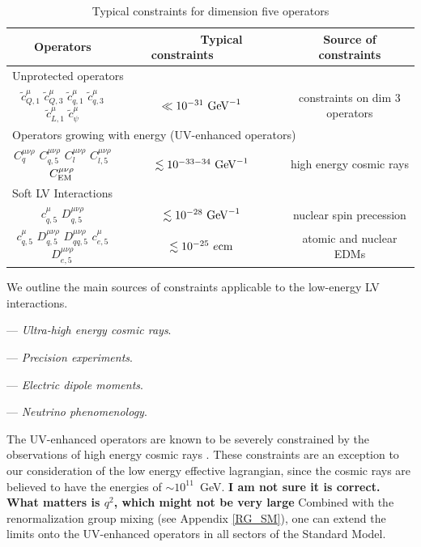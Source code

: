 \documentclass[12pt,preprintnumbers,nofootinbib]{revtex4}
\newcommand{\wt}{\widetilde}
\newcommand{\el}{{\rm EM}}
\begin{document}
\begin{table}[tb]
\label{constr_table}
\caption{Typical constraints for dimension five operators}
\begin{tabular}{|ccc|}
\hline
	\multicolumn{1}{|c|}{Operators} & 
	\multicolumn{1}{|c|}{~~~~~~Typical constraints~~~~~~} & 
	\multicolumn{1}{|c|}{Source of constraints} \\
\hline
	\multicolumn{3}{|l|}{\quad Unprotected operators} \\
\hline
	$ \wt{c}_{Q,1}^\mu  $
	$ \wt{c}_{Q,3}^\mu  $
	$ \wt{c}_{q,1}^\mu  $
	$ \wt{c}_{q,3}^\mu  $
	$ \wt{c}_{L,1}^\mu  $
	$ \wt{c}_{\psi}^\mu $  &
	$ \ll 10^{-31}~{\rm GeV}^{-1} $ &
	constraints on dim 3 operators
	\\
\hline
	\multicolumn{3}{|l|}{\quad Operators growing with energy (UV-enhanced operators)} \\
\hline
	$ C_{q}^{\mu\nu\rho} $ $ C_{q,5}^{\mu\nu\rho} $
	$ C_l^{\mu\nu\rho} $  $ C_{l,5}^{\mu\nu\rho} $
	$ C^{\mu\nu\rho}_\el $ &
	$ \lesssim 10^{-33-34}~{\rm GeV}^{-1} $
	&
	high energy cosmic rays
	\\
\hline
	\multicolumn{3}{|l|}{\quad Soft LV Interactions} \\
\hline
	$ c^\mu_{q,5} $ $ D^{\mu\nu\rho}_{q,5} $ &
	$ \lesssim 10^{-28}~{\rm GeV}^{-1} $     &
	nuclear spin precession \\
\hline
	$ c^\mu_{q,5} $ $ D^{\mu\nu\rho}_{q,5} $ 
	$ D^{\mu\nu\rho}_{qq,5} $ 
	$ c^\mu_{e,5} $ $ D^{\mu\nu\rho}_{e,5} $ &
	$ \lesssim 10^{-25}~e{\rm cm} $          &
	atomic and nuclear EDMs \\
\hline
\end{tabular}
\end{table}

	We outline the main sources of constraints applicable to the low-energy 
	LV interactions.
	
	--- {\it Ultra-high energy cosmic rays}. 

	--- {\it Precision experiments}. 

	--- {\it Electric dipole moments}. 

	--- {\it Neutrino phenomenology}. 
	
	The UV-enhanced operators are 
	known to be severely constrained by the
	observations of high energy cosmic rays 
\cite{Gagnon:2004xh}.
	These constraints are an exception to our consideration of the low energy 
	effective lagrangian, since the cosmic rays are believed to have the
	energies of $ \sim 10^{11} $~GeV. {\bf I am not sure it is correct. What matters 
	is $q^2$, which might not be very large}
	Combined with the renormalization group mixing
	(see Appendix \ref{RG_SM}), one can extend
	the limits onto the UV-enhanced operators in all sectors of the Standard Model.
	
\end{document}
